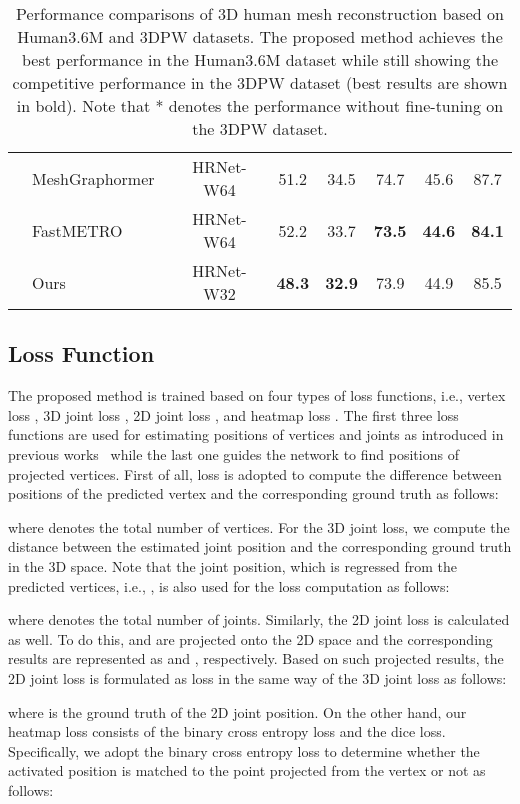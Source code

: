 \documentclass[10pt,twocolumn,letterpaper]{article}
\begin{document}
\begin{table*}[t]
\begin{tabular}{c l c c c c c c}
&MeshGraphormer~\cite{Lin21_ICCV} & HRNet-W64 & 51.2 & 34.5 & 74.7 & 45.6 & 87.7\\
&FastMETRO~\cite{Cho22} & HRNet-W64 & 52.2 & 33.7 & \textbf{73.5} & \textbf{44.6} & \textbf{84.1}\\
\hline
&Ours & HRNet-W32 & \textbf{48.3} & \textbf{32.9} & 73.9 & 44.9 & 85.5\\ \bottomrule
\hline
\end{tabular}
\caption{\label{table:performance_total} Performance comparisons of 3D human mesh reconstruction based on Human3.6M and 3DPW datasets. The proposed method achieves the best performance in the Human3.6M dataset while still showing the competitive performance in the 3DPW dataset (best results are shown in bold). Note that * denotes the performance without fine-tuning on the 3DPW dataset.}

\end{table*}



\subsection{Loss Function}
The proposed method is trained based on four types of loss functions, i.e., vertex loss , 3D joint loss , 2D joint loss , and heatmap loss .
The first three loss functions are used for estimating positions of vertices and joints as introduced in previous works~\cite{Lin21, Lin21_ICCV, Cho22} while the last one guides the network to find positions of projected vertices.
First of all,  loss is adopted to compute the difference between positions of the predicted vertex  and the corresponding ground truth  as follows:

where  denotes the total number of vertices.
For the 3D joint loss, we compute the distance between the estimated joint position  and the corresponding ground truth  in the 3D space. Note that the joint position, which is regressed from the predicted vertices, i.e., , is also used for the loss computation as follows:

where  denotes the total number of joints.
Similarly, the 2D joint loss is calculated as well. To do this,  and  are projected onto the 2D space and the corresponding results are represented as  and , respectively.
Based on such projected results, the 2D joint loss is formulated as  loss in the same way of the 3D joint loss as follows:

where  is the ground truth of the 2D joint position.
On the other hand, our heatmap loss  consists of the binary cross entropy loss and the dice loss. Specifically, we adopt the binary cross entropy loss to determine whether the activated position is matched to the point projected from the vertex or not as follows:
\end{document}
